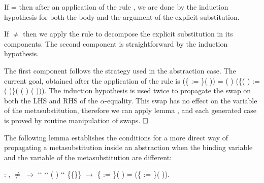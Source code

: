 \begin{coqdoccode}
\end{coqdoccode}
If  =     then after an application of the rule , we are done by the induction hypothesis for both the body and the argument of the explicit substitution.
\begin{coqdoccode}
\end{coqdoccode}
If  \ensuremath{\not=}     then we apply the rule  to decompose the explicit substitution in its components. The second component is straightforward  by the induction hypothesis.
\begin{coqdoccode}
\end{coqdoccode}
The first component follows the strategy used in the abstraction case. The current goal, obtained after the application of the rule  is    (\{ := \}(   )) =
    (   ) (\{(   ) := (   )\}( (   )  (   ))). The induction hypothesis is used twice to propagate the swap on both the LHS and RHS of the $\alpha$-equality. This swap has no effect on the variable  of the metasubstitution, therefore we can apply lemma , and each generated case is proved by routine manipulation of swaps. $\hfill\Box$
\begin{coqdoccode}
\coqdocemptyline
\end{coqdoccode}
The following lemma establishes the conditions for a more direct way of propagating a metasubstitution inside an abstraction when the binding variable and the variable of the metasubstitution are different:
\begin{coqdoccode}
\coqdocemptyline
\coqdocnoindent
{} : \coqdockw{\ensuremath{\forall}}     ,  \ensuremath{\not=}  \ensuremath{\rightarrow}  ``   ``  (  ) `` \{\{\}\} \ensuremath{\rightarrow} \{ := \}(  ) =   (\{ := \}(   )).\coqdoceol
\coqdocemptyline
\end{coqdoccode}
